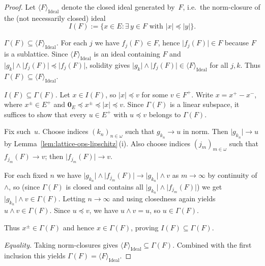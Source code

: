 \documentclass[12pt]{amsart}
\theoremstyle{plain}
\theoremstyle{definition}
\theoremstyle{remark}
\DeclareMathOperator{\Ideal}{Ideal}
\begin{document}
\begin{proof}
Let $\langle F \rangle_{\Ideal}$ denote the closed ideal generated by~$F$,
i.e.\ the norm-closure of the (not necessarily closed) ideal
\[
    I(F) := \{x \in E \colon \exists\, y \in F \text{ with }
    \lvert x \rvert \preceq \lvert y \rvert\}.
\]

\emph{$\Gamma(F) \subseteq \langle F \rangle_{\Ideal}$.}
For each $j$ we have $f_j(F) \in F$, hence $\lvert f_j(F) \rvert \in F$ because
$F$ is a sublattice.  Since $\langle F \rangle_{\Ideal}$ is an ideal containing
$F$ and $\lvert g_k \rvert \wedge \lvert f_j(F) \rvert \preceq \lvert f_j(F) \rvert$,
solidity gives
$\lvert g_k \rvert \wedge \lvert f_j(F) \rvert \in \langle F \rangle_{\Ideal}$
for all $j, k$.  Thus $\Gamma(F) \subseteq \langle F \rangle_{\Ideal}$.

\medskip
\emph{$I(F) \subseteq \Gamma(F)$.}
Let $x \in I(F)$, so $\lvert x \rvert \preceq v$ for some $v \in F^+$.
Write $x = x^+ - x^-$, where $x^\pm \in E^+$ and
$\mathbf{0}_E \preceq x^\pm \preceq \lvert x \rvert \preceq v$.  Since
$\Gamma(F)$ is a linear subspace, it suffices to show that every $u \in E^+$
with $u \preceq v$ belongs to $\Gamma(F)$.

Fix such~$u$.  Choose indices $(k_n)_{n \in \omega}$ such that $g_{k_n} \to u$ in norm.
Then $\lvert g_{k_n} \rvert \to u$ by
Lemma~\ref{lem:lattice-ops-lipschitz}\,(i).  Also choose indices
$(j_m)_{m \in \omega}$ such that $f_{j_m}(F) \to v$; then
$\lvert f_{j_m}(F) \rvert \to v$.

For each fixed $n$ we have
$\lvert g_{k_n} \rvert \wedge \lvert f_{j_m}(F) \rvert
\to \lvert g_{k_n} \rvert \wedge v$ as $m \to \infty$ by continuity of
$\wedge$, so (since $\Gamma(F)$ is closed and contains all
$\lvert g_{k_n} \rvert \wedge \lvert f_{j_m}(F) \rvert$) we get
$\lvert g_{k_n} \rvert \wedge v \in \Gamma(F)$.  Letting $n \to \infty$ and
using closedness again yields $u \wedge v \in \Gamma(F)$.  Since
$u \preceq v$, we have $u \wedge v = u$, so $u \in \Gamma(F)$.

Thus $x^\pm \in \Gamma(F)$ and hence $x \in \Gamma(F)$, proving
$I(F) \subseteq \Gamma(F)$.

\medskip
\emph{Equality.}
Taking norm-closures gives
$\langle F \rangle_{\Ideal} \subseteq \Gamma(F)$.  Combined with the first
inclusion this yields $\Gamma(F) = \langle F \rangle_{\Ideal}$.


\end{proof}
\end{document}
